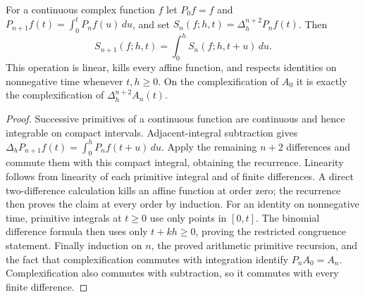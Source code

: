 \begin{definition}
\label{kernel:spectral-smoothing}
\leanok
For a continuous complex function $f$ let $P_0f=f$ and
$P_{n+1}f(t)=\int_0^tP_nf(u)\,du$, and set
$S_n(f;h,t)=\Delta_h^{n+2}P_nf(t)$.
Then
\[
 S_{n+1}(f;h,t)=\int_0^h S_n(f;h,t+u)\,du.
\]
This operation is linear, kills every affine function, and respects
identities on nonnegative time whenever $t,h\geq0$.
On the complexification of $A_0$ it is exactly the complexification of
$\Delta_h^{n+2}A_n(t)$.
\end{definition}
\begin{proof}
Successive primitives of a continuous function are continuous and hence
integrable on compact intervals.  Adjacent-integral subtraction gives
$\Delta_hP_{n+1}f(t)=\int_0^hP_nf(t+u)\,du$.
Apply the remaining $n+2$ differences and commute them with this
compact integral, obtaining the recurrence.
Linearity follows from linearity of each primitive integral and of
finite differences.  A direct two-difference calculation kills an
affine function at order zero; the recurrence then proves the claim
at every order by induction.
For an identity on nonnegative time, primitive integrals at $t\geq0$
use only points in $[0,t]$.  The binomial difference formula then uses
only $t+kh\geq0$, proving the restricted congruence statement.
Finally induction on $n$, the proved arithmetic primitive recursion,
and the fact that complexification commutes with integration identify
$P_nA_0=A_n$.  Complexification also commutes with subtraction, so it
commutes with every finite difference.
\end{proof}

